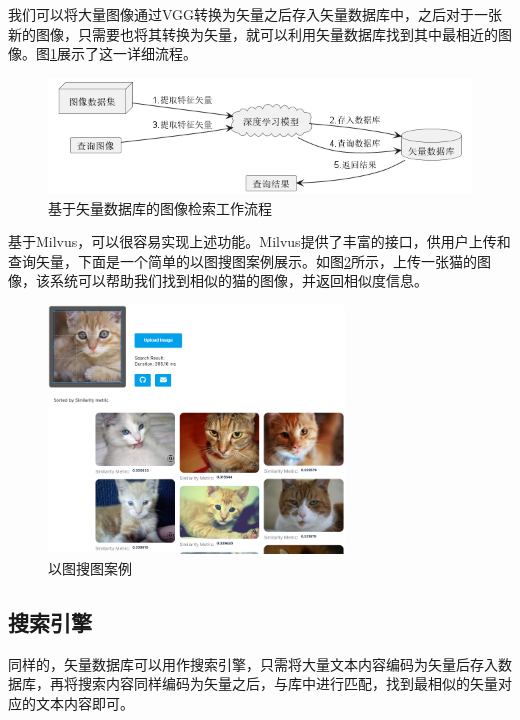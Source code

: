我们可以将大量图像通过VGG转换为矢量之后存入矢量数据库中，之后对于一张新的图像，只需要也将其转换为矢量，就可以利用矢量数据库找到其中最相近的图像。图\ref{fig:pic2pic}展示了这一详细流程。

\begin{figure}[H]
    \includegraphics[width=\textwidth]{examples/pic2pic.png}
    \centering
    \caption{基于矢量数据库的图像检索工作流程}
    \label{fig:pic2pic}
\end{figure}

基于Milvus，可以很容易实现上述功能。Milvus提供了丰富的接口，供用户上传和查询矢量，下面是一个简单的以图搜图案例展示。如图\ref{fig:pic2pic_demo}所示，上传一张猫的图像，该系统可以帮助我们找到相似的猫的图像，并返回相似度信息。

\begin{figure}[H]
    \includegraphics[width=0.7\textwidth]{examples/pic2pic demo.png}
    \centering
    \caption{以图搜图案例}
    \label{fig:pic2pic_demo}
\end{figure}

\subsection{搜索引擎}

同样的，矢量数据库可以用作搜索引擎，只需将大量文本内容编码为矢量后存入数据库，再将搜索内容同样编码为矢量之后，与库中进行匹配，找到最相似的矢量对应的文本内容即可。

